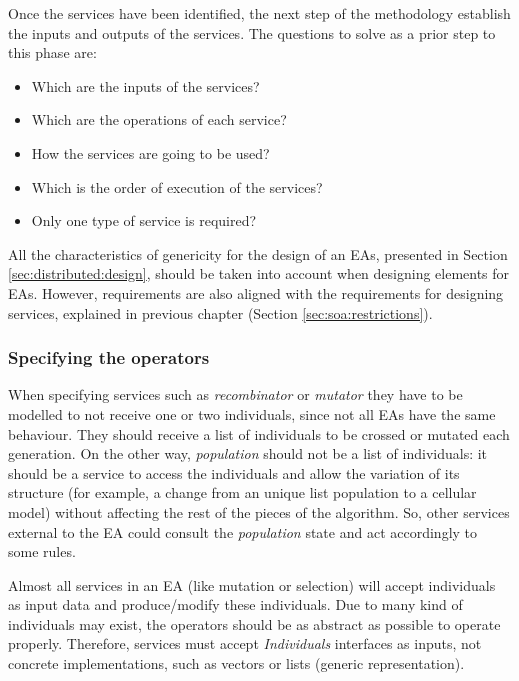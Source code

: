 Once the services have been identified, the next step of the methodology establish the inputs and outputs of the services. The questions to solve as a prior step to this phase are:

\begin{itemize}
\item Which are the inputs of the services?
\item Which are the operations of each service?
\item How the services are going to be used?
\item Which is the order of execution of the services?
\item Only one type of service is required?
\end{itemize}


 All the characteristics of genericity for the design of an EAs, presented in Section \ref{sec:distributed:design}, should be taken into account when designing elements for EAs. However, requirements are also aligned with the requirements for designing services, explained in previous chapter (Section \ref{sec:soa:restrictions}).


\subsubsection{Specifying the operators}
When specifying services such as 
{\em recombinator} or {\em mutator} they have to be modelled to not receive one or two
individuals, since not all EAs have the same behaviour. They should receive a
list of individuals to be crossed or mutated each generation. On the other way,
{\em population} should not be a list of individuals: it should be a service
to access the individuals and allow the variation of its structure (for example, a change
from an unique list population to a cellular model) without
affecting  the rest of the pieces of the algorithm. So, other services
external to the EA could consult the {\em population} state and act
accordingly to some rules. 

Almost all services in an EA (like mutation or selection) will accept individuals as input data and produce/modify these individuals. Due to many kind of individuals may exist, the operators should be as abstract as possible to operate properly. Therefore, services must accept {\em Individuals} interfaces as inputs, not concrete implementations, such as vectors or lists (generic representation). 

